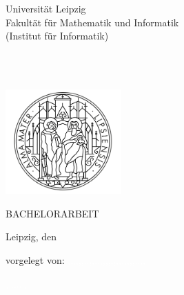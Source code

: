 \begin{titlepage}
	\begin{addmargin}[-1cm]{-3cm}
    \begin{center}
        \large

        \hfill

        \vfill
        
        Universität Leipzig\\
        Fakultät für Mathematik und Informatik\\
        (Institut für Informatik)\\
        
        \vfill

        \begingroup
            \color{Maroon}\LARGE{\spacedallcaps{\myTitle}} \\ \bigskip
            \large{\spacedallcaps{\mySubtitle}}\\ \bigskip
        \endgroup
        
        \vfill
        
        \includegraphics[height=4cm]{abb/uni-leipzig-logo-pur.png} \\ \medskip %
        
        \vfill

        

        {\Huge BACHELORARBEIT} \bigskip

        \vfill
        
    \end{center}

        Leipzig, den \myTime \\ \medskip
        
    \begin{flushright}
        vorgelegt von: \textcolor{white}{,,,,,,,,,,,,,,,,,,,,,,,,,,,,,} \\
        \vspace{2pt}
        
        \noindent
         \textcolor{white}{,,,,,,,,}\\ 
        \vspace{4pt}
        

\end{flushright}
\end{addmargin}
\end{titlepage}
